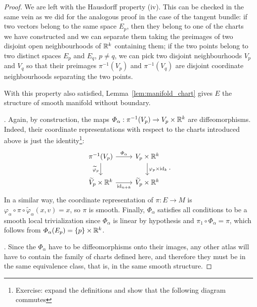 \begin{proof}
  We are left with the Hausdorff property (iv).
  This can be checked in the same vein as we did for the analogous proof in the case of the tangent bundle:
  if two vectors belong to the same space $E_p$, then they belong to one of the charts we have constructed and we can separate them taking the preimages of two disjoint open neighbourhoods of $\mathbb{R}^k$ containing them; if the two points belong to two distinct spaces $E_p$ and $E_q$, $p\neq q$, we can pick two disjoint neighbourhoods $V_p$ and $V_q$ so that their preimages $\pi^{-1}(V_p)$ and $\pi^{-1}(V_q)$ are disjoint coordinate neighbourhoods separating the two points.

  With this property also satisfied, Lemma~\ref{lem:manifold_chart} gives $E$ the structure of smooth manifold without boundary.

  .
  Again, by construction, the maps $\varPhi_\alpha : \pi^{-1}(V_p) \to V_p\times\mathbb{R}^k$ are diffeomorphisms.
  Indeed, their coordinate representations with respect to the charts introduced above is just the identity\footnote{Exercise: expand the definitions and show that the following diagram commutes}:
  \begin{equation}
    \begin{tikzcd}
      {\pi^{-1}(V_p)} & {V_p\times\R^k} \\
      {\widetilde{V}_p\times\R^k} & {\widetilde{V}_p\times\R^k}
      \arrow["{\varPhi_\alpha}", from=1-1, to=1-2]
      \arrow["{\varphi_p\times\id_k}", from=1-2, to=2-2]
      \arrow["{\widetilde{\varphi}_p}"', from=1-1, to=2-1]
      \arrow["{\id_{n+k}}"', from=2-1, to=2-2]
    \end{tikzcd}.
  \end{equation}
  In a similar way, the coordinate representation of $\pi : E \to M$ is $\varphi_\alpha \circ \pi \circ \widetilde{\varphi}_\alpha (x,v) = x$, so $\pi$ is smooth.
  Finally, $\Phi_\alpha$ satisfies all conditions to be a smooth local trivialization since $\varPhi_\alpha$ is linear by hypothesis and $\pi_1 \circ \varPhi_\alpha = \pi$, which follows from $\varPhi_\alpha(E_p) = \{p\}\times \mathbb{R}^k$.

  .
  Since the $\varPhi_\alpha$ have to be diffeomorphisms onto their images, any other atlas will have to contain the family of charts defined here, and therefore they must be in the same equivalence class, that is, in the same smooth structure.
\end{proof}


